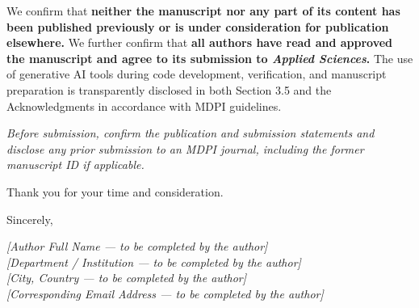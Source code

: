 \documentclass[11pt,a4paper]{article}
\begin{document}
We confirm that \textbf{neither the manuscript nor any part of its content has been published previously or is under consideration for publication elsewhere.} We further confirm that \textbf{all authors have read and approved the manuscript and agree to its submission to \emph{Applied Sciences}.} The use of generative AI tools during code development, verification, and manuscript preparation is transparently disclosed in both Section 3.5 and the Acknowledgments in accordance with MDPI guidelines.

\emph{Before submission, confirm the publication and submission statements and disclose any prior submission to an MDPI journal, including the former manuscript ID if applicable.}

Thank you for your time and consideration.

Sincerely,

\emph{{[}Author Full Name --- to be completed by the author{]}}\\
\emph{{[}Department / Institution --- to be completed by the author{]}}\\
\emph{{[}City, Country --- to be completed by the author{]}}\\
\emph{{[}Corresponding Email Address --- to be completed by the author{]}}
\end{document}
